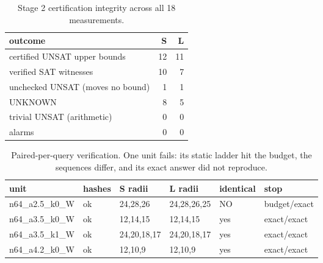 \begin{table}[htbp]
\centering
\begin{tabular}{lrr}
\toprule
outcome & S & L \\
\midrule
certified UNSAT upper bounds & 12 & 11 \\
verified SAT witnesses & 10 & 7 \\
unchecked UNSAT (moves no bound) & 1 & 1 \\
UNKNOWN & 8 & 5 \\
trivial UNSAT (arithmetic) & 0 & 0 \\
alarms & 0 & 0 \\
\bottomrule
\end{tabular}
\caption{Stage 2 certification integrity across all 18 measurements.}
\label{tab:integrity}
\end{table}

\begin{table}[htbp]
\centering
\begin{tabular}{llllll}
\toprule
unit & hashes & S radii & L radii & identical & stop \\
\midrule
n64\_a2.5\_k0\_W & ok & 24,28,26 & 24,28,26,25 & NO & budget/exact \\
n64\_a3.5\_k0\_W & ok & 12,14,15 & 12,14,15 & yes & exact/exact \\
n64\_a3.5\_k1\_W & ok & 24,20,18,17 & 24,20,18,17 & yes & exact/exact \\
n64\_a4.2\_k0\_W & ok & 12,10,9 & 12,10,9 & yes & exact/exact \\
\bottomrule
\end{tabular}
\caption{Paired-per-query verification. One unit fails: its static ladder hit the budget, the sequences differ, and its exact answer did not reproduce.}
\label{tab:pairing}
\end{table}

